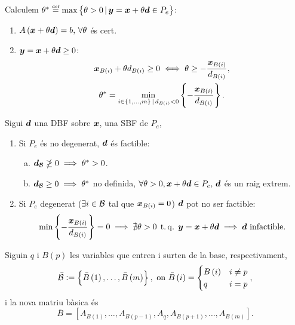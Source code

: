 \begin{prop}
    Calculem $\theta^* \stackrel{\text{\tiny def}}{=} \max \left\{ \theta > 0 \, |\, \boldsymbol{y} = \boldsymbol{x} + \theta \boldsymbol{d} \in P_e\right\}$:
    \begin{enumerate}
        \item $A\left(\boldsymbol{x} + \theta \boldsymbol{d}\right) = b,\, \forall \theta$ és cert.
        \item $\boldsymbol{y} = \boldsymbol{x} + \theta \boldsymbol{d} \geq 0$:
            \begin{gather*}
                \boldsymbol{x}_{B\left(i\right)} + \theta d_{B\left(i\right)} \geq 0 \iff \theta \geq -\frac{\boldsymbol{x}_{B\left(i\right)}}{d_{B\left(i\right)}}, \\
                \theta^* = \min_{i \in \left\{1, \dots, m \right\} \, |\, d_{B\left(i\right)} < 0} \left\{ - \frac{\boldsymbol{x}_{B\left(i\right)}}{d_{B\left(i\right)}} \right\}.
            \end{gather*}
    \end{enumerate}
\end{prop}
\begin{prop}
    Sigui $\boldsymbol{d}$ una DBF sobre $\boldsymbol{x}$, una SBF de $P_e$,
    \begin{enumerate}
        \item Si $P_e$ és no degenerat, $\boldsymbol{d}$ és factible:
            \begin{enumerate}[a)]
                \item $\boldsymbol{d}_{\mathcal{B}} \ngeq 0 \implies \theta^* > 0$.
                \item $\boldsymbol{d}_{\mathcal{B}} \geq 0 \implies \theta^*$ no definida, $\forall \theta > 0, \boldsymbol{x} + \theta \boldsymbol{d} \in P_e,\, \boldsymbol{d}$ és un raig extrem.
            \end{enumerate}
        \item Si $P_e$ degenerat ($\exists i \in \mathcal{B}$ tal que $\boldsymbol{x}_{B\left(i\right)} = 0$) $\boldsymbol{d}$ pot no ser factible:
            \begin{gather*}
                \min \left\{ -\frac{\boldsymbol{x}_{B\left(i\right)}}{d_{B\left(i\right)}} \right\} = 0 \implies \nexists \theta > 0 \operatorname{\;t.q.\;} \boldsymbol{y} = \boldsymbol{x}+\theta \boldsymbol{d} \implies \boldsymbol{d} \text{ infactible}.
            \end{gather*}
    \end{enumerate}
\end{prop}
\begin{prop}
    Siguin $q$ i $B\left(p\right)$ les variables que entren i surten de la base, respectivament,
    \begin{gather*}
        \bar{\mathcal{B}} := \left\{ \bar{B}\left(1\right), \dots, \bar{B}\left(m\right) \right\}, \text{ on } \bar{B}\left(i\right) =
        \begin{cases}
            B\left(i\right) & i \neq p \\
            q & i = p
        \end{cases},
    \end{gather*}
    i la nova matriu bàsica és
    \[ \bar{B} = \left[A_{B\left(1\right)}, \dots, A_{B\left(p-1\right)}, A_q, A_{B\left(p+1\right)}, \dots, A_{B\left(m\right)} \right]. \]
\end{prop}
